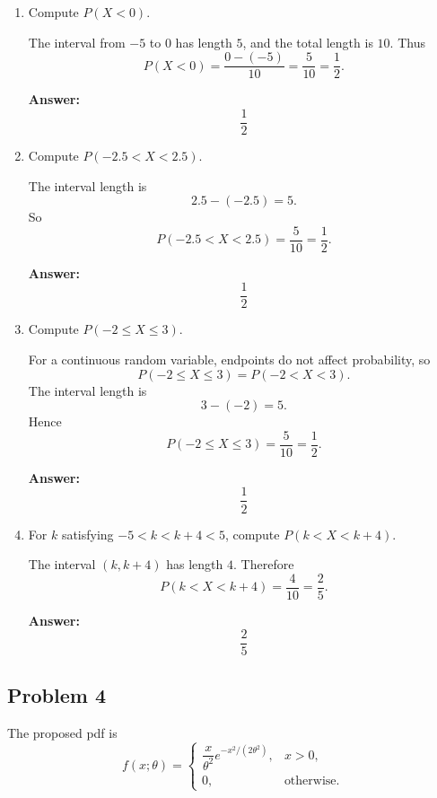 \documentclass[11pt]{article}
\begin{document}
\begin{enumerate}
    \item[(a)] Compute \(P(X<0)\).

    The interval from \(-5\) to \(0\) has length \(5\), and the total length is \(10\). Thus
    \[
    P(X<0)=\frac{0-(-5)}{10}=\frac{5}{10}=\frac12.
    \]

    \textbf{Answer:}
    \[
    \boxed{\frac12}
    \]

    \item[(b)] Compute \(P(-2.5<X<2.5)\).

    The interval length is
    \[
    2.5-(-2.5)=5.
    \]
    So
    \[
    P(-2.5<X<2.5)=\frac{5}{10}=\frac12.
    \]

    \textbf{Answer:}
    \[
    \boxed{\frac12}
    \]

    \item[(c)] Compute \(P(-2\le X\le 3)\).

    For a continuous random variable, endpoints do not affect probability, so
    \[
    P(-2\le X\le 3)=P(-2<X<3).
    \]
    The interval length is
    \[
    3-(-2)=5.
    \]
    Hence
    \[
    P(-2\le X\le 3)=\frac{5}{10}=\frac12.
    \]

    \textbf{Answer:}
    \[
    \boxed{\frac12}
    \]

    \item[(d)] For \(k\) satisfying \(-5<k<k+4<5\), compute \(P(k<X<k+4)\).

    The interval \((k,k+4)\) has length \(4\). Therefore
    \[
    P(k<X<k+4)=\frac{4}{10}=\frac25.
    \]

    \textbf{Answer:}
    \[
    \boxed{\frac25}
    \]
\end{enumerate}

\subsection*{Problem 4}

The proposed pdf is
\[
f(x;\theta)=
\begin{cases}
\dfrac{x}{\theta^2}e^{-x^2/(2\theta^2)}, & x>0,\\[6pt]
0, & \text{otherwise.}
\end{cases}
\]
\end{document}
